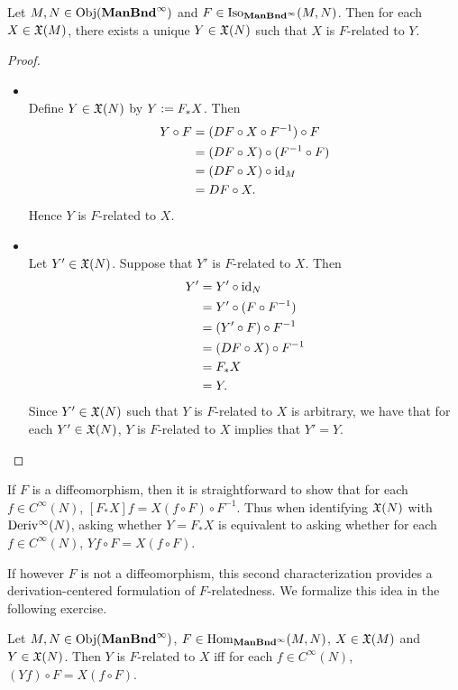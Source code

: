\documentclass{book}
\begin{document}
\begin{ex}
	Let $M, N \in \operatorname{Obj}(\operatorname*{\text{\textbf{ManBnd}}^{\infty}})$ and $F \in \operatorname{Iso}_{\operatorname*{\text{\textbf{ManBnd}}^{\infty}}}(M, N)$. Then for each $X \in \mathfrak{X}(M)$, there exists a unique $Y \in \mathfrak{X}(N)$ such that $X$ is $F$-related to $Y$. 
\end{ex}

\begin{proof}\
	\begin{itemize}
		\item {} \\
		Define $Y \in \mathfrak{X}(N)$ by $Y \vcentcolon= F_*X$. Then 
		\begin{align*}
			Y \circ F 
			& = (DF \circ X \circ F^{-1}) \circ F \\
			& = (DF \circ X) \circ (F^{-1} \circ F) \\
			& = (DF \circ X) \circ \operatorname{id}_M \\
			& = DF \circ X.
		\end{align*}
		Hence $Y$ is $F$-related to $X$. 
		\item {} \\
		Let $Y' \in \mathfrak{X}(N)$. Suppose that $Y'$ is $F$-related to $X$. Then 
		\begin{align*}
			Y' 
			& = Y' \circ \operatorname{id}_N \\
			& = Y' \circ (F \circ F^{-1}) \\
			& = (Y' \circ F) \circ F^{-1} \\
			& = (DF \circ X) \circ F^{-1} \\
			& = F_*X \\
			& = Y.
		\end{align*}
		Since $Y' \in \mathfrak{X}(N)$ such that $Y$ is $F$-related to $X$ is arbitrary, we have that for each $Y' \in \mathfrak{X}(N)$, $Y$ is $F$-related to $X$ implies that $Y' = Y$. 
	\end{itemize}
\end{proof}

If $F$ is a diffeomorphism, then it is straightforward to show that for each $f \in C^{\infty}(N)$, $[F_*X]f = X(f \circ F) \circ F^{-1}$. Thus when identifying $\mathfrak{X}(N)$ with $\operatorname{Deriv^{\infty}}(N)$, asking whether $Y = F_*X$ is equivalent to asking whether for each $f \in C^{\infty}(N)$, $Yf \circ F = X(f \circ F)$. 

If however $F$ is not a diffeomorphism, this second characterization provides a derivation-centered formulation of $F$-relatedness. We formalize this idea in the following exercise.

\begin{ex}
	Let $M, N \in \operatorname{Obj}(\operatorname*{\text{\textbf{ManBnd}}^{\infty}})$, $F \in \operatorname{Hom}_{\operatorname*{\text{\textbf{ManBnd}}^{\infty}}}(M, N)$, $X \in \mathfrak{X}(M)$ and $Y \in \mathfrak{X}(N)$. Then $Y$ is $F$-related to $X$ iff for each $f \in C^{\infty}(N)$, $(Yf) \circ F = X(f \circ F)$. 
\end{ex}
\end{document}
